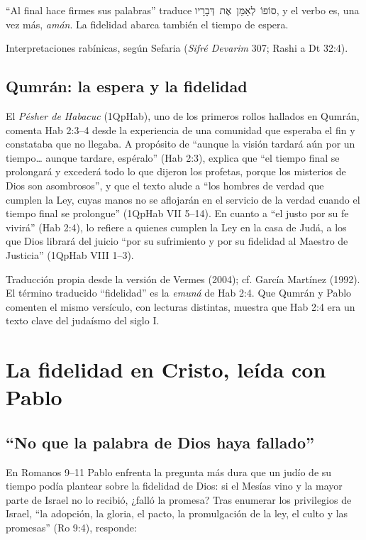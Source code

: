 \documentclass[11pt,letterpaper]{article}
\newcommand{\heb}[1]{\mbox{\foreignlanguage{hebrew}{#1}}}
\begin{document}
``Al final hace firmes sus palabras'' traduce \heb{סוֹפוֹ לְאַמֵּן אֶת דְּבָרָיו}, y el verbo es, una vez más, \emph{amán}. La fidelidad abarca también el tiempo de espera.

\begin{nota}[Precisión]
Interpretaciones rabínicas, según Sefaria (\emph{Sifré Devarim} 307; Rashi a Dt 32:4).
\end{nota}

\subsection{Qumrán: la espera y la fidelidad}
El \emph{Pésher de Habacuc} (1QpHab), uno de los primeros rollos hallados en Qumrán, comenta Hab 2:3--4 desde la experiencia de una comunidad que esperaba el fin y constataba que no llegaba. A propósito de ``aunque la visión tardará aún por un tiempo\ldots{} aunque tardare, espéralo'' (Hab 2:3), explica que ``el tiempo final se prolongará y excederá todo lo que dijeron los profetas, porque los misterios de Dios son asombrosos'', y que el texto alude a ``los hombres de verdad que cumplen la Ley, cuyas manos no se aflojarán en el servicio de la verdad cuando el tiempo final se prolongue'' (1QpHab VII 5--14). En cuanto a ``el justo por su fe vivirá'' (Hab 2:4), lo refiere a quienes cumplen la Ley en la casa de Judá, a los que Dios librará del juicio ``por su sufrimiento y por su fidelidad al Maestro de Justicia'' (1QpHab VIII 1--3).

\begin{nota}[Precisión]
Traducción propia desde la versión de Vermes (2004); cf. García Martínez (1992). El término traducido ``fidelidad'' es la \emph{emuná} de Hab 2:4. Que Qumrán y Pablo comenten el mismo versículo, con lecturas distintas, muestra que Hab 2:4 era un texto clave del judaísmo del siglo I.
\end{nota}

\section{La fidelidad en Cristo, leída con Pablo}

\subsection{``No que la palabra de Dios haya fallado''}
En Romanos 9--11 Pablo enfrenta la pregunta más dura que un judío de su tiempo podía plantear sobre la fidelidad de Dios: si el Mesías vino y la mayor parte de Israel no lo recibió, ¿falló la promesa? Tras enumerar los privilegios de Israel, ``la adopción, la gloria, el pacto, la promulgación de la ley, el culto y las promesas'' (Ro 9:4), responde:
\end{document}
